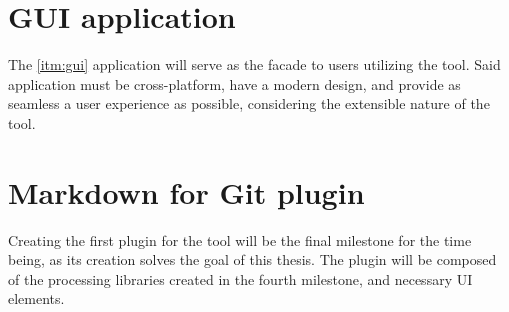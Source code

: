\section{GUI application}

The \ref{itm:gui} application will serve as the facade to users utilizing the tool. Said application must be cross-platform, have a modern design, and provide as seamless a user experience as possible, considering the extensible nature of the tool.

\section{Markdown for Git plugin}

Creating the first plugin for the tool will be the final milestone for the time being, as its creation solves the goal of this thesis.
The plugin will be composed of the processing libraries created in the fourth milestone, and necessary UI elements.
